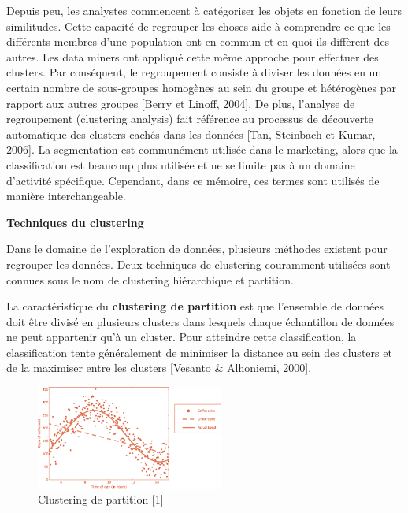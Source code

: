 \documentclass[12pt]{article}
\begin{document}
{Depuis peu, les analystes commencent à catégoriser les objets en fonction de leurs similitudes. Cette capacité de regrouper les choses aide à comprendre ce que les différents membres d'une population ont en commun et en quoi ils diffèrent des autres. Les data miners ont appliqué cette même approche pour effectuer des clusters. 
Par conséquent, le regroupement consiste à diviser les données en un certain nombre de sous-groupes homogènes au sein du groupe et hétérogènes par rapport aux autres groupes {\color{red}[Berry et Linoff, 2004]}.
De plus, l'analyse de regroupement (clustering analysis) fait référence au processus de découverte automatique des clusters cachés dans les données {\color{red}[Tan, Steinbach et Kumar, 2006]}.
La segmentation est communément utilisée dans le marketing, alors que la classification est beaucoup plus utilisée et ne se limite pas à un domaine d'activité spécifique.
Cependant, dans ce mémoire, ces termes sont utilisés de manière interchangeable.

\textbf{Techniques du clustering}

Dans le domaine de l'exploration de données, plusieurs méthodes existent pour regrouper les données. Deux techniques de clustering couramment utilisées sont connues sous le nom de clustering hiérarchique et partition.

La caractéristique du \textbf{clustering de partition} est que l'ensemble de données doit être divisé en plusieurs clusters dans lesquels chaque échantillon de données ne peut appartenir qu'à un cluster. Pour atteindre cette classification, la classification tente généralement de minimiser la distance au sein des clusters et de la maximiser entre les clusters {\color{red}[Vesanto \& Alhoniemi, 2000].}

\begin{figure}[H]
	\centering
    \includegraphics[width=0.55\textwidth]{image5.png}
     \caption{ Clustering de partition [1]}
    \label{fig:5}
\end{figure}


}
\end{document}
